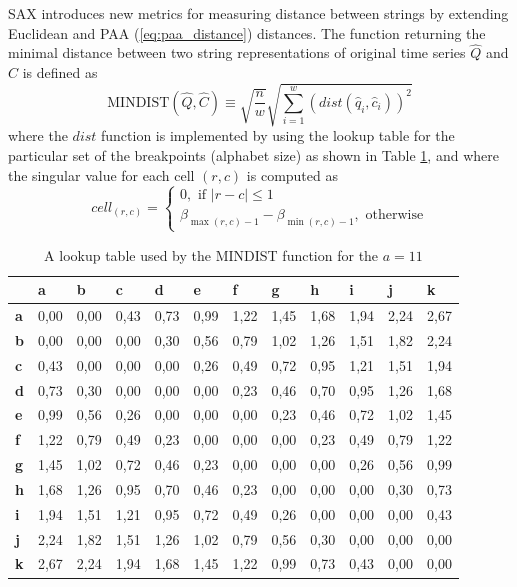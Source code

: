 SAX introduces new metrics for measuring distance between strings by extending Euclidean and PAA (\ref{eq:paa_distance}) distances. 
The function returning the minimal distance between two string representations of original time series $\widehat{Q}$ and $\widehat{C}$ is defined as
\begin{equation}
\text{MINDIST}(\widehat{Q},\widehat{C}) \equiv \sqrt{ \frac{n}{w} } \sqrt{ \sum_{i=1}^{w} ( dist( \widehat{q}_{i}, \widehat{c}_{i} ) )^{2}}
\label{eq:sax_mindist}
\end{equation} 
where the $dist$ function is implemented by using the lookup table for the particular set of the breakpoints (alphabet size) as shown in 
Table \ref{tbl:sax_lookup}, and where the singular value for each cell $(r,c)$ is computed as 
\begin{equation}
cell_{(r,c)} = 
\begin{cases} 
0, \text{ if }\left| r-c \right| \leq 1 \\
\beta_{\max(r,c) - 1} - \beta_{\min(r,c) - 1}, \text{ otherwise}
\end{cases}
\label{eq:cell}
\end{equation}


\begin{table}
\caption{A lookup table used by the MINDIST function for the $a=11$}
\label{tbl:sax_lookup}
\small
\begin{tabularx}{\textwidth}{|l|X|X|X|X|X|X|X|X|X|X|X|}
\hline
&\textbf{a}&\textbf{b}&\textbf{c}&\textbf{d}&\textbf{e}&\textbf{f}&\textbf{g}&\textbf{h}&\textbf{i}&\textbf{j}&\textbf{k} \\
\hline
\textbf{a}& 0,00 & 0,00 & 0,43 & 0,73 & 0,99 & 1,22 & 1,45 & 1,68 & 1,94 & 2,24 & 2,67 \\
\hline
\textbf{b}& 0,00 & 0,00 & 0,00 & 0,30 & 0,56 & 0,79 & 1,02 & 1,26 & 1,51 & 1,82 & 2,24 \\
\hline
\textbf{c}& 0,43 & 0,00 & 0,00 & 0,00 & 0,26 & 0,49 & 0,72 & 0,95 & 1,21 & 1,51 & 1,94 \\ 
\hline
\textbf{d}& 0,73 & 0,30 & 0,00 & 0,00 & 0,00 & 0,23 & 0,46 & 0,70 & 0,95 & 1,26 & 1,68 \\ 
\hline
\textbf{e}& 0,99 & 0,56 & 0,26 & 0,00 & 0,00 & 0,00 & 0,23 & 0,46 & 0,72 & 1,02 & 1,45 \\ 
\hline
\textbf{f}& 1,22 & 0,79 & 0,49 & 0,23 & 0,00 & 0,00 & 0,00 & 0,23 & 0,49 & 0,79 & 1,22 \\ 
\hline
\textbf{g}& 1,45 & 1,02 & 0,72 & 0,46 & 0,23 & 0,00 & 0,00 & 0,00 & 0,26 & 0,56 & 0,99 \\ 
\hline
\textbf{h}& 1,68 & 1,26 & 0,95 & 0,70 & 0,46 & 0,23 & 0,00 & 0,00 & 0,00 & 0,30 & 0,73 \\ 
\hline
\textbf{i}& 1,94 & 1,51 & 1,21 & 0,95 & 0,72 & 0,49 & 0,26 & 0,00 & 0,00 & 0,00 & 0,43 \\ 
\hline
\textbf{j}& 2,24 & 1,82 & 1,51 & 1,26 & 1,02 & 0,79 & 0,56 & 0,30 & 0,00 & 0,00 & 0,00 \\ 
\hline
\textbf{k}& 2,67 & 2,24 & 1,94 & 1,68 & 1,45 & 1,22 & 0,99 & 0,73 & 0,43 & 0,00 & 0,00 \\ 
\hline
\end{tabularx}
\end{table}

